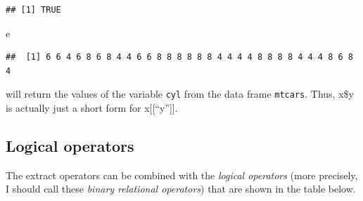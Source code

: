 \documentclass[
  12pt,
  oneside]{book}
\newenvironment{Shaded}{\begin{snugshade}}{\end{snugshade}}
\newcommand{\NormalTok}[1]{#1}
\theoremstyle{definition}
\theoremstyle{definition}
\theoremstyle{definition}
\theoremstyle{definition}
\theoremstyle{remark}
\begin{document}
\begin{verbatim}
## [1] TRUE
\end{verbatim}

\begin{Shaded}
\begin{Highlighting}[]
\NormalTok{e}
\end{Highlighting}
\end{Shaded}

\begin{verbatim}
##  [1] 6 6 4 6 8 6 8 4 4 6 6 8 8 8 8 8 8 4 4 4 4 8 8 8 8 4 4 4 8 6 8 4
\end{verbatim}

will return the values of the variable \texttt{cyl} from the data frame \texttt{mtcars}.
Thus, x\$y is actually just a short form for x{[}{[}``y''{]}{]}.

\hypertarget{logical-operators}{%
\subsection{Logical operators}\label{logical-operators}}

The extract operators can be combined with the \emph{logical operators} (more precisely, I should call these \emph{binary relational operators}) that are shown in the table below.
\end{document}
